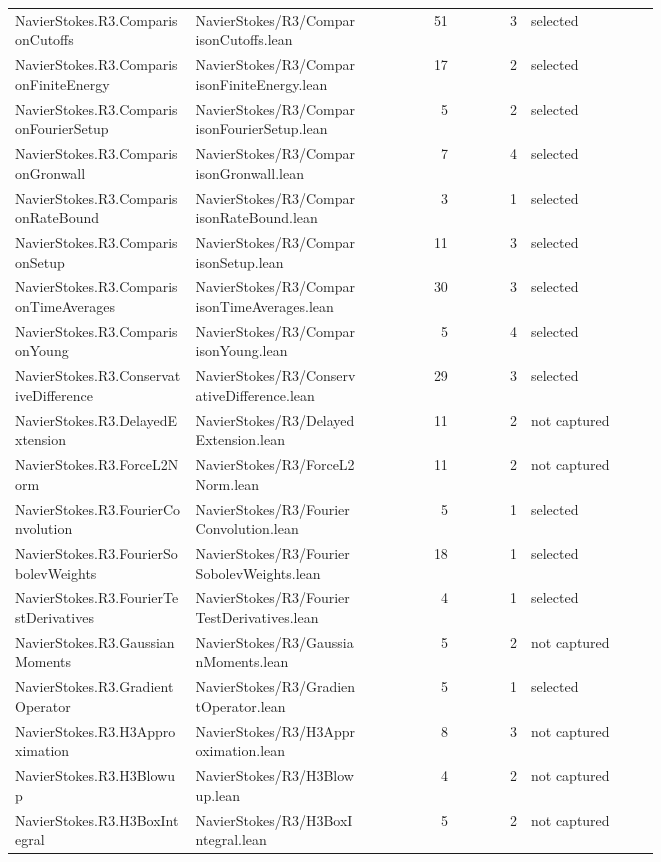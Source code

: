 \documentclass[10pt]{article}
\begin{document}
\begin{longtable}{p{0.28\linewidth}p{0.27\linewidth}r r p{0.20\linewidth}}
NavierStokes.R3.ComparisonCutoffs & NavierStokes/R3/ComparisonCutoffs.lean & 51 & 3 & selected\\
NavierStokes.R3.ComparisonFiniteEnergy & NavierStokes/R3/ComparisonFiniteEnergy.lean & 17 & 2 & selected\\
NavierStokes.R3.ComparisonFourierSetup & NavierStokes/R3/ComparisonFourierSetup.lean & 5 & 2 & selected\\
NavierStokes.R3.ComparisonGronwall & NavierStokes/R3/ComparisonGronwall.lean & 7 & 4 & selected\\
NavierStokes.R3.ComparisonRateBound & NavierStokes/R3/ComparisonRateBound.lean & 3 & 1 & selected\\
NavierStokes.R3.ComparisonSetup & NavierStokes/R3/ComparisonSetup.lean & 11 & 3 & selected\\
NavierStokes.R3.ComparisonTimeAverages & NavierStokes/R3/ComparisonTimeAverages.lean & 30 & 3 & selected\\
NavierStokes.R3.ComparisonYoung & NavierStokes/R3/ComparisonYoung.lean & 5 & 4 & selected\\
NavierStokes.R3.ConservativeDifference & NavierStokes/R3/ConservativeDifference.lean & 29 & 3 & selected\\
NavierStokes.R3.DelayedExtension & NavierStokes/R3/DelayedExtension.lean & 11 & 2 & not captured\\
NavierStokes.R3.ForceL2Norm & NavierStokes/R3/ForceL2Norm.lean & 11 & 2 & not captured\\
NavierStokes.R3.FourierConvolution & NavierStokes/R3/FourierConvolution.lean & 5 & 1 & selected\\
NavierStokes.R3.FourierSobolevWeights & NavierStokes/R3/FourierSobolevWeights.lean & 18 & 1 & selected\\
NavierStokes.R3.FourierTestDerivatives & NavierStokes/R3/FourierTestDerivatives.lean & 4 & 1 & selected\\
NavierStokes.R3.GaussianMoments & NavierStokes/R3/GaussianMoments.lean & 5 & 2 & not captured\\
NavierStokes.R3.GradientOperator & NavierStokes/R3/GradientOperator.lean & 5 & 1 & selected\\
NavierStokes.R3.H3Approximation & NavierStokes/R3/H3Approximation.lean & 8 & 3 & not captured\\
NavierStokes.R3.H3Blowup & NavierStokes/R3/H3Blowup.lean & 4 & 2 & not captured\\
NavierStokes.R3.H3BoxIntegral & NavierStokes/R3/H3BoxIntegral.lean & 5 & 2 & not captured\\

\end{longtable}
\end{document}

